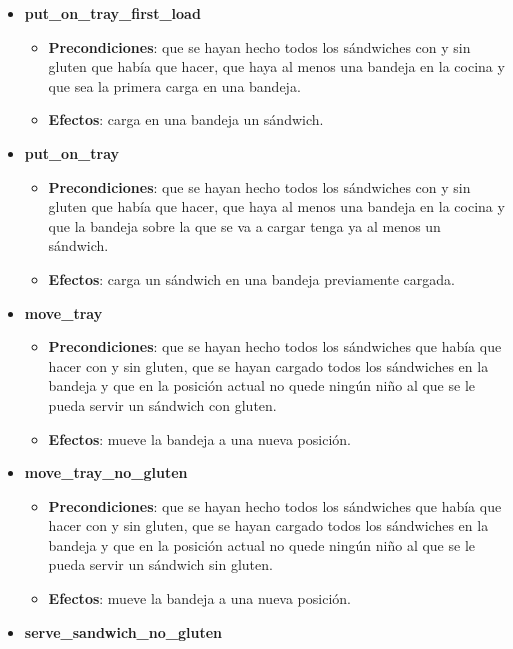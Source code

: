 \documentclass{article}
\begin{document}
\begin{itemize}
    \item \textbf{put\_on\_tray\_first\_load}
        \begin{itemize}
            \item \textbf{Precondiciones}: que se hayan hecho todos los sándwiches con y sin gluten que había que hacer, que haya al menos una bandeja en la cocina y que sea la primera carga en una bandeja.
            \item \textbf{Efectos}: carga en una bandeja un sándwich.            
        \end{itemize}
    \item \textbf{put\_on\_tray}
        \begin{itemize}
            \item \textbf{Precondiciones}: que se hayan hecho todos los sándwiches con y sin gluten que había que hacer, que haya al menos una bandeja en la cocina y que la bandeja sobre la que se va a cargar tenga ya al menos un sándwich.
            \item \textbf{Efectos}: carga un sándwich en una bandeja previamente cargada.
        \end{itemize}        
    \item \textbf{move\_tray}
        \begin{itemize}
            \item \textbf{Precondiciones}: que se hayan hecho todos los sándwiches que había que hacer con y sin gluten, que se hayan cargado todos los sándwiches en la bandeja y que en la posición actual no quede ningún niño al que se le pueda servir un sándwich con gluten.
            \item \textbf{Efectos}: mueve la bandeja a una nueva posición.
        \end{itemize}                
    \item \textbf{move\_tray\_no\_gluten}
        \begin{itemize}
            \item \textbf{Precondiciones}: que se hayan hecho todos los sándwiches que había que hacer con y sin gluten, que se hayan cargado todos los sándwiches en la bandeja y que en la posición actual no quede ningún niño al que se le pueda servir un sándwich sin gluten.
            \item \textbf{Efectos}: mueve la bandeja a una nueva posición.
        \end{itemize}                
    \item \textbf{serve\_sandwich\_no\_gluten}
        \begin{itemize}

\end{itemize}
\end{itemize}
\end{document}
